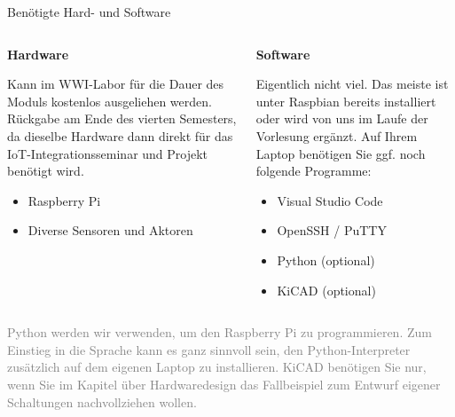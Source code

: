 \begin{frame}{Benötigte Hard- und Software}
        \begin{columns}
            \begin{column}[T]{.5\textwidth}
                \textbf{Hardware}
                \medskip

                \parbox{\linewidth}{
                    \footnotesize
                    Kann im WWI-Labor für die Dauer des Moduls kostenlos ausgeliehen
                    werden. Rückgabe am Ende des vierten Semesters, da dieselbe
                    Hardware dann direkt für das IoT-Integrationsseminar und Projekt
                    benötigt wird.
                }
                \medskip

                \begin{itemize}
                    \item Raspberry Pi
                    \item Diverse Sensoren und Aktoren
                \end{itemize}
            \end{column}
            \begin{column}[T]{.5\textwidth}
                \textbf{Software}
                \medskip

                \parbox{\linewidth}{
                    \footnotesize
                    Eigentlich nicht viel. Das meiste ist unter Raspbian bereits
                    installiert oder wird von uns im Laufe der Vorlesung ergänzt.
                    Auf Ihrem Laptop benötigen Sie ggf. noch folgende Programme:
                }
                \medskip

                \begin{itemize}
                    \item Visual Studio Code
                    \item OpenSSH / PuTTY
                    \item Python (optional)
                    \item KiCAD (optional)
                \end{itemize}
            \end{column}
        \end{columns}

        \bigskip

        \parbox{\linewidth}{
            \scriptsize
            \textcolor{gray}{
                Python werden wir verwenden, um den Raspberry Pi zu programmieren. Zum Einstieg
                in die Sprache kann es ganz sinnvoll sein, den Python-Interpreter zusätzlich auf
                dem eigenen Laptop zu installieren. KiCAD benötigen Sie nur, wenn Sie im Kapitel
                über Hardwaredesign das Fallbeispiel zum Entwurf eigener Schaltungen nachvollziehen
                wollen.
            }
        }
\end{frame}

